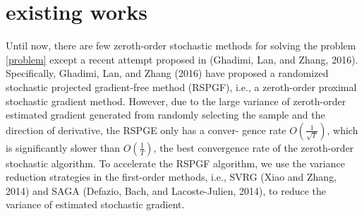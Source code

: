 \documentclass{article}
\theoremstyle{definition}
\theoremstyle{remark}
\begin{document}
\section{existing works}
{\color{Green}  Until now, there are few zeroth-order stochastic methods
for solving the problem \eqref{problem} except a recent attempt proposed in (Ghadimi, Lan, and Zhang, 2016). Specifically, Ghadimi, Lan, and Zhang (2016) have proposed a randomized stochastic projected gradient-free method (RSPGF),
i.e., a zeroth-order proximal stochastic gradient method. However, due to the large variance of zeroth-order estimated gradient generated from randomly selecting the sample and the direction of derivative, the RSPGE only has a conver-
gence rate $O(\frac{1}{\sqrt{T}})$, which is significantly slower than $O(\frac{1}{{T}})$,
the best convergence rate of the zeroth-order stochastic algorithm. To accelerate the RSPGF algorithm, we use the variance reduction strategies in the first-order methods, i.e.,
SVRG (Xiao and Zhang, 2014) and SAGA (Defazio, Bach, and Lacoste-Julien, 2014), to reduce the variance of estimated stochastic gradient.
}
\end{document}
